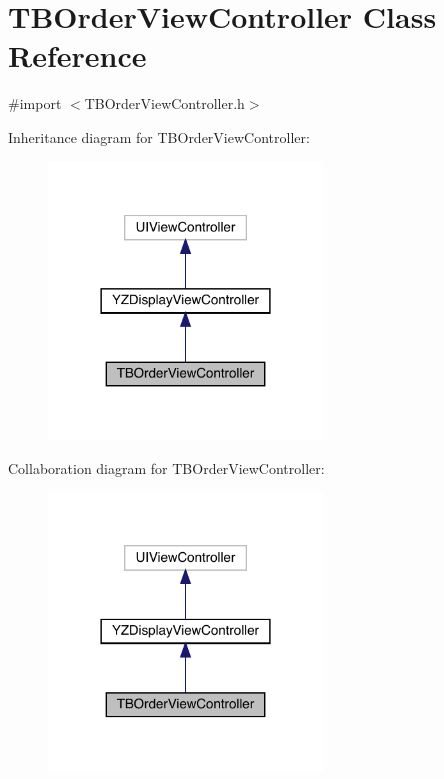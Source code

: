 \hypertarget{interface_t_b_order_view_controller}{}\section{T\+B\+Order\+View\+Controller Class Reference}
\label{interface_t_b_order_view_controller}


{\ttfamily \#import $<$T\+B\+Order\+View\+Controller.\+h$>$}



Inheritance diagram for T\+B\+Order\+View\+Controller\+:\nopagebreak
\begin{figure}[H]
\begin{center}
\leavevmode
\includegraphics[width=206pt]{interface_t_b_order_view_controller__inherit__graph}
\end{center}
\end{figure}


Collaboration diagram for T\+B\+Order\+View\+Controller\+:\nopagebreak
\begin{figure}[H]
\begin{center}
\leavevmode
\includegraphics[width=206pt]{interface_t_b_order_view_controller__coll__graph}
\end{center}
\end{figure}
